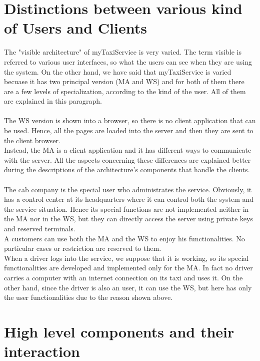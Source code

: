 \documentclass[../dd]{subfiles}
\begin{document}
\section{Distinctions between various kind of Users and Clients}
\label{ArchitecturalDesign:preamble}
The "visible architecture" of myTaxiService is very varied. The term visible is referred to various user interfaces, so what the users can see when they are using the system.
On the other hand, we have said that myTaxiService is varied becuase it has two principal version (MA and WS) and for both of them there are a few levels of specialization, according to the kind of the user. All of them are explained in this paragraph.\\
\\
The WS version is shown into a browser, so there is no client application that can be used. Hence, all the pages are loaded into the server and then they are sent to the client browser.\\
Instead, the MA is a client application and it has different ways to communicate with the server. All the aspects concerning these differences are explained better during the descriptions of the architecture's components that handle the clients.\\
\\
The cab company is the special user who administrates the service. Obviously, it has a control center at its headquarters where it can control both the system and the service situation. Hence its special functions are not implemented neither in the MA nor in the WS, but they can directly access the server using private keys and reserved terminals.\\
A customers can use both the MA and the WS to enjoy his functionalities. No particular cases or restriction are reserved to them.\\
When a driver logs into the service, we suppose that it is working, so its special functionalities are developed and implemented only for the MA. In fact no driver carries a computer with an internet connection on its taxi and uses it. On the other hand, since the driver is also an user, it can use the WS, but here has only the user functionalities due to the reason shown above.\\



\section{High level components and their interaction}
\label{ArchitecturalDesign:high_level}
\end{document}
